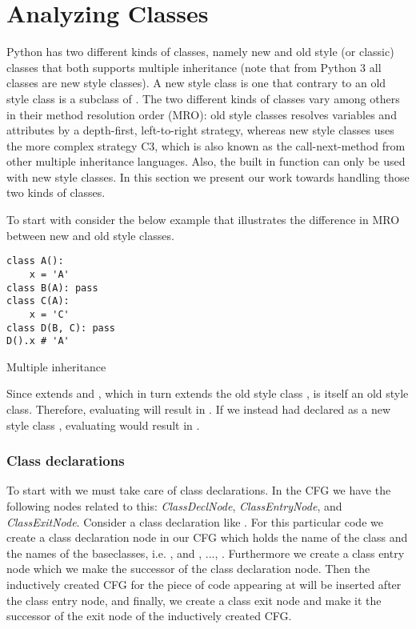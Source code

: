 \chapter{Analyzing Classes}
Python has two different kinds of classes, namely new and old style (or classic) classes that both supports multiple inheritance (note that from Python 3 all classes are new style classes). A new style class is one that contrary to an old style class is a subclass of . The two different kinds of classes vary among others in their method resolution order (MRO)\cite{pyref.typehierarchy}: old style classes resolves variables and attributes by a depth-first, left-to-right strategy, whereas new style classes uses the more complex strategy C3\cite{pyref.c3mro}, which is also known as the call-next-method from other multiple inheritance languages. Also, the built in function  can only be used with new style classes. In this section we present our work towards handling those two kinds of classes.

To start with consider the below example that illustrates the difference in MRO between new and old style classes.

\begin{listing}[H]
	\begin{verbatim}
class A():
	x = 'A'
class B(A): pass
class C(A):
	x = 'C'
class D(B, C): pass
D().x # 'A'
	\end{verbatim}
	\caption{Multiple inheritance}\label{code:OldStyleMROExample}
\end{listing}

Since  extends  and , which in turn extends the old style class ,  is itself an old style class. Therefore, evaluating  will result in . If we instead had declared  as a new style class , evaluating  would result in .


\subsection{Class declarations}
To start with we must take care of class declarations. In the CFG we have the following nodes related to this: \textit{ClassDeclNode}, \textit{ClassEntryNode}, and \textit{ClassExitNode}. Consider a class declaration like . For this particular code we create a class declaration node in our CFG which holds the name of the class and the names of the baseclasses, i.e. , and , ..., . Furthermore we create a class entry node which we make the successor of the class declaration node. Then the inductively created CFG for the piece of code appearing at  will be inserted after the class entry node, and finally, we create a class exit node and make it the successor of the exit node of the inductively created  CFG.

